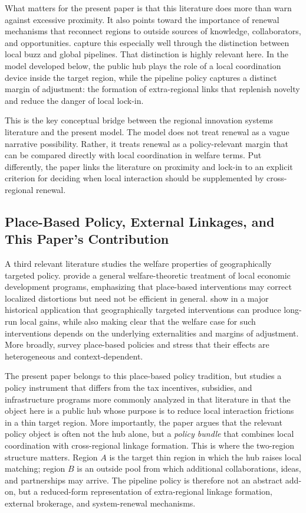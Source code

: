 What matters for the present paper is that this literature does more than warn against excessive proximity. It also points toward the importance of renewal mechanisms that reconnect regions to outside sources of knowledge, collaborators, and opportunities. \citet{BatheltMalmbergMaskell2004} capture this especially well through the distinction between local buzz and global pipelines. That distinction is highly relevant here. In the model developed below, the public hub plays the role of a local coordination device inside the target region, while the pipeline policy captures a distinct margin of adjustment: the formation of extra-regional links that replenish novelty and reduce the danger of local lock-in.

This is the key conceptual bridge between the regional innovation systems literature and the present model. The model does not treat renewal as a vague narrative possibility. Rather, it treats renewal as a policy-relevant margin that can be compared directly with local coordination in welfare terms. Put differently, the paper links the literature on proximity and lock-in to an explicit criterion for deciding when local interaction should be supplemented by cross-regional renewal.

\subsection{Place-Based Policy, External Linkages, and This Paper's Contribution}

A third relevant literature studies the welfare properties of geographically targeted policy. \citet{KlineMoretti2014ARE} provide a general welfare-theoretic treatment of local economic development programs, emphasizing that place-based interventions may correct localized distortions but need not be efficient in general. \citet{KlineMoretti2014QJE} show in a major historical application that geographically targeted interventions can produce long-run local gains, while also making clear that the welfare case for such interventions depends on the underlying externalities and margins of adjustment. More broadly, \citet{NeumarkSimpson2015} survey place-based policies and stress that their effects are heterogeneous and context-dependent.

The present paper belongs to this place-based policy tradition, but studies a policy instrument that differs from the tax incentives, subsidies, and infrastructure programs more commonly analyzed in that literature in that the object here is a public hub whose purpose is to reduce local interaction frictions in a thin target region. More importantly, the paper argues that the relevant policy object is often not the hub alone, but a \emph{policy bundle} that combines local coordination with cross-regional linkage formation. This is where the two-region structure matters. Region $A$ is the target thin region in which the hub raises local matching; region $B$ is an outside pool from which additional collaborations, ideas, and partnerships may arrive. The pipeline policy is therefore not an abstract add-on, but a reduced-form representation of extra-regional linkage formation, external brokerage, and system-renewal mechanisms.

